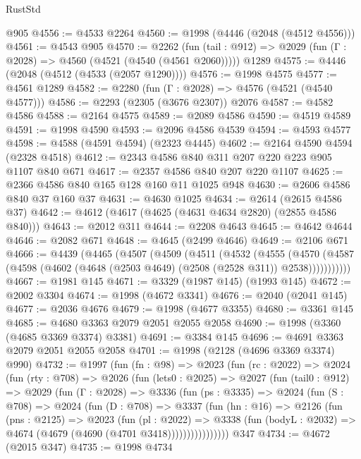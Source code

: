 \begin{lexlean}{RustStd}
\begin{coremodule}
    @905
@4556 := @4533 @2264
@4560 := @1998 (@4446 (@2048 (@4512 @4556)))
@4561 := @4543 @905
@4570 := @2262
    (fun (tail : @912) => @2029 (fun (Γ : @2028) => @4560 (@4521 (@4540 (@4561 @2060)))))
    @1289
@4575 := @4446 (@2048 (@4512 (@4533 (@2057 @1290))))
@4576 := @1998 @4575
@4577 := @4561 @1289
@4582 := @2280 (fun (Γ : @2028) => @4576 (@4521 (@4540 @4577)))
@4586 := @2293 (@2305 (@3676 @2307)) @2076
@4587 := @4582 @4586
@4588 := @2164 @4575
@4589 := @2089 @4586
@4590 := @4519 @4589
@4591 := @1998 @4590
@4593 := @2096 @4586 @4539
@4594 := @4593 @4577
@4598 := @4588 (@4591 @4594) (@2323 @4445)
@4602 := @2164 @4590 @4594 (@2328 @4518)
@4612 := @2343 @4586 @840 @311 @207 @220 @223 @905 @1107 @840 @671
@4617 := @2357 @4586 @840 @207 @220 @1107
@4625 := @2366 @4586 @840 @165 @128 @160 @11 @1025 @948
@4630 := @2606 @4586 @840 @37 @160 @37
@4631 := @4630 @1025
@4634 := @2614 (@2615 @4586 @37)
@4642 := @4612 (@4617 (@4625 (@4631 @4634 @2820) (@2855 @4586 @840)))
@4643 := @2012 @311
@4644 := @2208 @4643
@4645 := @4642 @4644
@4646 := @2082 @671
@4648 := @4645 (@2499 @4646)
@4649 := @2106 @671
@4666 := @4439
    (@4465
      (@4507
        (@4509
          (@4511
            (@4532
              (@4555
                (@4570
                  (@4587 (@4598 (@4602 (@4648 (@2503 @4649) (@2508 (@2528 @311)) @2538)))))))))))
@4667 := @1981 @145
@4671 := @3329 (@1987 @145) (@1993 @145)
@4672 := @2002 @3304
@4674 := @1998 (@4672 @3341)
@4676 := @2040 (@2041 @145)
@4677 := @2036 @4676
@4679 := @1998 (@4677 @3355)
@4680 := @3361 @145
@4685 := @4680 @3363 @2079 @2051 @2055 @2058
@4690 := @1998 (@3360 (@4685 @3369 @3374) @3381)
@4691 := @3384 @145
@4696 := @4691 @3363 @2079 @2051 @2055 @2058
@4701 := @1998 (@2128 (@4696 @3369 @3374) @990)
@4732 := @1997
    (fun (fn : @98) =>
    @2023
      (fun (rc : @2022) =>
      @2024
        (fun (rty : @708) =>
        @2026
          (fun (lets0 : @2025) =>
          @2027
            (fun (tail0 : @912) =>
            @2029
              (fun (Γ : @2028) =>
              @3336
                (fun (ps : @3335) =>
                @2024
                  (fun (S : @708) =>
                  @2024
                    (fun (D : @708) =>
                    @3337
                      (fun (hn : @16) =>
                      @2126
                        (fun (pns : @2125) =>
                        @2023
                          (fun (pl : @2022) =>
                          @3338
                            (fun (bodyL : @2032) => @4674 (@4679 (@4690 (@4701 @3418))))))))))))))))
    @347
@4734 := @4672 (@2015 @347)
@4735 := @1998 @4734

\end{coremodule}
\end{lexlean}

